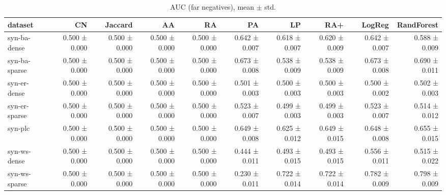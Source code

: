 \begin{table}[t]
\centering
\caption{AUC (far negatives), mean $\pm$ std.}
\label{tab:main_auc_far}
\begin{tabular}{lrrrrrrrrr}
\hline
dataset & CN & Jaccard & AA & RA & PA & LP & RA+ & LogReg & RandForest \\
\hline
syn-ba-dense & 0.500 ± 0.000 & 0.500 ± 0.000 & 0.500 ± 0.000 & 0.500 ± 0.000 & 0.642 ± 0.007 & 0.618 ± 0.007 & 0.620 ± 0.009 & 0.642 ± 0.007 & 0.588 ± 0.009 \\
syn-ba-sparse & 0.500 ± 0.000 & 0.500 ± 0.000 & 0.500 ± 0.000 & 0.500 ± 0.000 & 0.673 ± 0.008 & 0.538 ± 0.009 & 0.538 ± 0.009 & 0.673 ± 0.008 & 0.690 ± 0.011 \\
syn-er-dense & 0.500 ± 0.000 & 0.500 ± 0.000 & 0.500 ± 0.000 & 0.500 ± 0.000 & 0.501 ± 0.003 & 0.500 ± 0.003 & 0.500 ± 0.003 & 0.500 ± 0.002 & 0.502 ± 0.003 \\
syn-er-sparse & 0.500 ± 0.000 & 0.500 ± 0.000 & 0.500 ± 0.000 & 0.500 ± 0.000 & 0.523 ± 0.007 & 0.499 ± 0.003 & 0.499 ± 0.003 & 0.523 ± 0.007 & 0.514 ± 0.012 \\
syn-plc & 0.500 ± 0.000 & 0.500 ± 0.000 & 0.500 ± 0.000 & 0.500 ± 0.000 & 0.649 ± 0.008 & 0.625 ± 0.012 & 0.649 ± 0.015 & 0.648 ± 0.008 & 0.655 ± 0.015 \\
syn-ws-dense & 0.500 ± 0.000 & 0.500 ± 0.000 & 0.500 ± 0.000 & 0.500 ± 0.000 & 0.444 ± 0.011 & 0.493 ± 0.015 & 0.493 ± 0.015 & 0.556 ± 0.011 & 0.515 ± 0.022 \\
syn-ws-sparse & 0.500 ± 0.000 & 0.500 ± 0.000 & 0.500 ± 0.000 & 0.500 ± 0.000 & 0.230 ± 0.011 & 0.722 ± 0.014 & 0.722 ± 0.014 & 0.782 ± 0.009 & 0.798 ± 0.009 \\
\hline
\end{tabular}
\end{table}